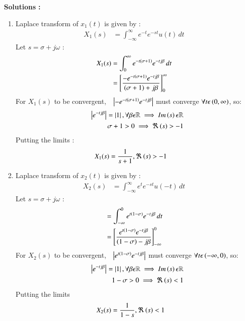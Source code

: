 \documentclass[journal,12pt,onecolumn]{IEEEtran}
\theoremstyle{remark}
\begin{document}
\textbf{Solutions :}
    
    \begin{enumerate}
        \item 
Laplace transform of $x_1(t)$ is given by :
\begin{align}
    X_1(s) &=  \int_{-\infty}^{\infty} e^{-t}e^{-st}u(t) \,dt
    \end{align}
    Let $s=\sigma+j\omega$ :
\begin{align}
 X_1(s) &= \int_{0}^{\infty}e^{-t\left(\sigma+1\right)}e^{-tj\beta} \,dt\\
       &=  \left[\frac{-e^{-t\left(\sigma+1\right)}e^{-tj\beta}}{\left(\sigma+1\right)+j\beta}\right]_{0}^{\infty}  \\
       \end{align}
        For $X_1(s)$ to be convergent,$\quad\left\vert-e^{-t\left(\sigma+1\right)}e^{-tj\beta}\right\vert$ must converge $\forall t \epsilon \left(0,\infty\right)$, so:
        \begin{align}
\quad\left\vert e^{-tj\beta}\right\vert = \left\vert1\right\vert, \forall \beta \epsilon \mathbb{R} \implies Im\left(s\right) \epsilon \mathbb{R}\\
\sigma + 1 > 0 \implies  \Re\left(s\right)>-1   
        \end{align}
Putting the limits :
       \begin{align}
X_1(s)&= \frac{1}{s+1} , \Re\left(s\right) > -1 
\end{align}
\item  
Laplace transform of $x_2(t)$ is given by :
\begin{align}
    X_2(s) &=  \int_{-\infty}^{\infty} e^{t}e^{-st}u(-t) \,dt
        \end{align}
    Let $s=\sigma+j\omega$ :
\begin{align}
    &= \int_{-\infty}^{0}e^{t\left(1-\sigma\right)}e^{-tj\beta} \,dt\\
      &=  \left[\frac{e^{t\left(1-\sigma\right)}e^{-tj\beta}}{\left(1-\sigma\right)-j\beta}\right]_{-\infty}^{0}  
     \end{align}
      For $X_2(s)$ to be convergent,$\quad\left\vert e^{t\left(1-\sigma\right)}e^{-tj\beta}\right\vert$ must converge $\forall t\epsilon\left(-\infty,0\right)$, so:
     \begin{align}
\quad\left\vert e^{-tj\beta}\right\vert = \left\vert1\right\vert, \forall \beta \epsilon \mathbb{R} \implies Im\left(s\right) \epsilon \mathbb{R}\\
1-\sigma > 0 \implies  \Re\left(s\right) < 1 
        \end{align}
Putting the limits 
     \begin{align}
            X_2(s)&= \frac{1}{1-s} , \Re\brak{s} < 1

\end{align}
\end{enumerate}
\end{document}
